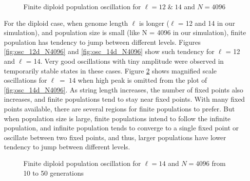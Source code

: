 \begin{figure}[h]
\begin{center}
\caption{Finite diploid population oscillation for $\ell = 12 \;\&\; 14$ and $N = 4096$}
\label{oscillation_12d_14d_N4096}
\end{center}
\end{figure}

For the diploid case, when genome length $\ell$ is longer ($\ell$ = 12 and 14 in our simulation), 
and population size is small (like N = 4096 in our simulation), finite population has tendency to 
jump between different levels. Figures \ref{fig:osc_12d_N4096} and \ref{fig:osc_14d_N4096} show such tendency for 
$\ell$ = 12 and $\ell$ = 14. Very good oscillations with tiny amplitude were observed in temporarily stable states 
in these cases. Figure \ref{oscillation_14d_N4096} shows magnified scale oscillations for $\ell \;=\; 14$ 
when high peak is omitted from the plot of \ref{fig:osc_14d_N4096}. 
As string length increases, the number of fixed points also increases, 
and finite populations tend to stay near fixed points. With many fixed points available, 
there are several regions for finite populations to prefer. 
But when population size is large, finite populations intend to follow the infinite population, 
and infinite population tends to 
converge to a single fixed point or oscillate between two fixed points, and thus, 
larger populations have lower tendency to jump between different levels.

\begin{figure}[h]
\begin{center}
 \hspace{-3em}%
\caption{Finite diploid population oscillation for $\ell = 14$ and $N = 4096$ from 10 to 50 generations}
\label{oscillation_14d_N4096}
\end{center}
\end{figure}

